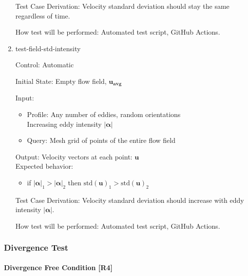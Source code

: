 \documentclass[12pt, titlepage]{article}
\begin{document}
\begin{enumerate}
  Test Case Derivation: Velocity standard deviation should stay the same regardless of time.

  How test will be performed: Automated test script, GitHub Actions.

  \item{test-field-std-intensity\\}

  Control: Automatic
            
  Initial State: Empty flow field, $\mathbf{u_{avg}}$
            
  Input:
  \begin{itemize}
    \item Profile: Any number of eddies, random orientations\\
    Increasing eddy intensity $|\mathbf{\alpha}|$
    \item Query: Mesh grid of points of the entire flow field
  \end{itemize}
  Output: Velocity vectors at each point: $\mathbf{u}$\\
  Expected behavior:
  \begin{itemize}
    \item if $|\mathbf{\alpha}|_1 > |\mathbf{\alpha}|_2$ then $\text{std}(\mathbf{u})_1 > \text{std}(\mathbf{u})_2$
  \end{itemize}

  Test Case Derivation: Velocity standard deviation should increase with eddy intensity $|\mathbf{\alpha}|$.

  How test will be performed: Automated test script, GitHub Actions.

\end{enumerate}

\subsubsection{Divergence Test} \label{DivergenceFree}
\paragraph{Divergence Free Condition [R4]} 
\end{document}
